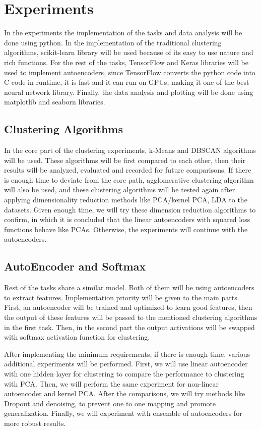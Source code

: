 \documentclass[journal]{IEEEtran}
\begin{document}
\section{Experiments}

In the experiments the implementation of the tasks and data analysis will be done using python. In the implementation of the traditional clustering algorithms, scikit-learn library will be used because of its easy to use nature and rich functions. For the rest of the tasks, TensorFlow and Keras libraries will be used to implement autoencoders, since TensorFlow converts the python code into C code in runtime, it is fast and it can run on GPUs, making it one of the best neural network library. Finally, the data analysis and plotting will be done using matplotlib and seaborn libraries.

\subsection{Clustering Algorithms}
In the core part of the clustering experiments, k-Means and DBSCAN algorithms will be used. These algorithms will be first compared to each other, then their results will be analyzed, evaluated and recorded for future comparisons. If there is enough time to deviate from the core path, agglomerative clustering algorithm will also be used, and these clustering algorithms will be tested again after applying dimensionality reduction methods like PCA/kernel PCA, LDA to the datasets. Given enough time, we will try these dimension reduction algorithms to confirm\cite{baldi1989neural}, in which it is concluded that the linear autoencoders with squared loss functions behave like PCAs. Otherwise, the experiments will continue with the autoencoders.  

\subsection{AutoEncoder and Softmax}
Rest of the tasks share a similar model. Both of them will be using autoencoders to extract features. Implementation priority will be given to the main parts. First, an autoencoder will be trained and optimized to learn good features, then the output of these features will be passed to the mentioned clustering algorithms in the first task. Then, in the second part the output activations will be swapped with softmax activation function for clustering.\par
After implementing the minimum requirements, if there is enough time, various additional experiments will be performed. First, we will use linear autoencoder with one hidden layer for clustering to compare the performance to clustering with PCA. Then, we will perform the same experiment for non-linear autoencoder and kernel PCA. After the comparisons, we will try methods like Dropout\cite{srivastava2014dropout} and denoising, to prevent one to one mapping and promote generalization\cite{vincent2010stacked}. Finally, we will experiment with ensemble of autoencoders for more robust results. 
\end{document}
